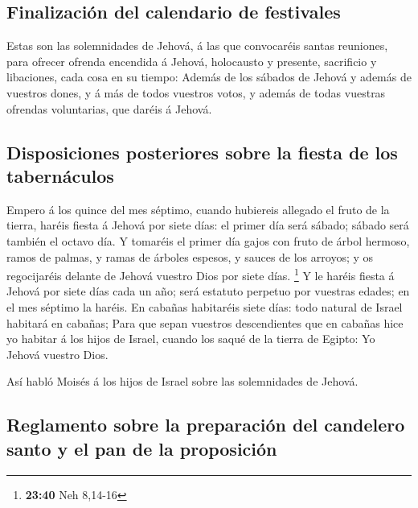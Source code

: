 \hypertarget{finalizaciuxf3n-del-calendario-de-festivales}{%
\subsection{Finalización del calendario de
festivales}\label{finalizaciuxf3n-del-calendario-de-festivales}}

 Estas son las solemnidades de Jehová, á las que
convocaréis santas reuniones, para ofrecer ofrenda encendida á Jehová,
holocausto y presente, sacrificio y libaciones, cada cosa en su tiempo:
 Además de los sábados de Jehová y además de vuestros
dones, y á más de todos vuestros votos, y además de todas vuestras
ofrendas voluntarias, que daréis á Jehová.

\hypertarget{disposiciones-posteriores-sobre-la-fiesta-de-los-tabernuxe1culos}{%
\subsection{Disposiciones posteriores sobre la fiesta de los
tabernáculos}\label{disposiciones-posteriores-sobre-la-fiesta-de-los-tabernuxe1culos}}

 Empero á los quince del mes séptimo, cuando hubiereis
allegado el fruto de la tierra, haréis fiesta á Jehová por siete días:
el primer día será sábado; sábado será también el octavo día.
 Y tomaréis el primer día gajos con fruto de árbol hermoso,
ramos de palmas, y ramas de árboles espesos, y sauces de los arroyos; y
os regocijaréis delante de Jehová vuestro Dios por siete días.
\footnote{\textbf{23:40} Neh 8,14-16}  Y le haréis fiesta á
Jehová por siete días cada un año; será estatuto perpetuo por vuestras
edades; en el mes séptimo la haréis.  En cabañas habitaréis
siete días: todo natural de Israel habitará en cabañas; 
Para que sepan vuestros descendientes que en cabañas hice yo habitar á
los hijos de Israel, cuando los saqué de la tierra de Egipto: Yo Jehová
vuestro Dios.

 Así habló Moisés á los hijos de Israel sobre las
solemnidades de Jehová.

\hypertarget{reglamento-sobre-la-preparaciuxf3n-del-candelero-santo-y-el-pan-de-la-proposiciuxf3n}{%
\subsection{Reglamento sobre la preparación del candelero santo y el pan
de la
proposición}\label{reglamento-sobre-la-preparaciuxf3n-del-candelero-santo-y-el-pan-de-la-proposiciuxf3n}}

